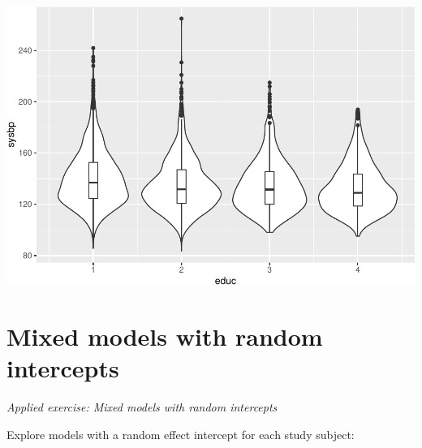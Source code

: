 \documentclass[
]{book}
\newenvironment{Shaded}{\begin{snugshade}}{\end{snugshade}}
\newcommand{\DataTypeTok}[1]{\textcolor[rgb]{0.13,0.29,0.53}{#1}}
\newcommand{\FloatTok}[1]{\textcolor[rgb]{0.00,0.00,0.81}{#1}}
\newcommand{\KeywordTok}[1]{\textcolor[rgb]{0.13,0.29,0.53}{\textbf{#1}}}
\newcommand{\NormalTok}[1]{#1}
\newcommand{\OperatorTok}[1]{\textcolor[rgb]{0.81,0.36,0.00}{\textbf{#1}}}
\newcommand{\OtherTok}[1]{\textcolor[rgb]{0.56,0.35,0.01}{#1}}
\newcommand{\StringTok}[1]{\textcolor[rgb]{0.31,0.60,0.02}{#1}}
\begin{document}
\begin{Shaded}
\end{Shaded}

\includegraphics{adv_epi_analysis_files/figure-latex/unnamed-chunk-287-1.pdf}

\hypertarget{mixed-models-with-random-intercepts}{%
\section{Mixed models with random intercepts}\label{mixed-models-with-random-intercepts}}

\emph{Applied exercise: Mixed models with random intercepts}

Explore models with a random effect intercept for each study subject:
\end{document}
